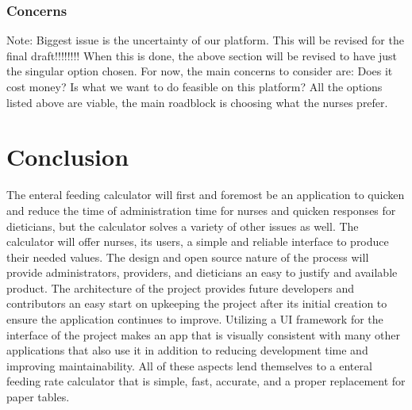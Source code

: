 \documentclass[onecolumn, draftclsnofoot,10pt, compsoc]{IEEEtran}
\begin{document}
\subsubsection{Concerns}
Note: Biggest issue is the uncertainty of our platform. This will be revised for the final draft!!!!!!!! When this is done, the above section will be revised to have just the singular option chosen.
\newline
For now, the main concerns to consider are: Does it cost money? Is what we want to do feasible on this platform? All the options listed above are viable, the main roadblock is choosing what the nurses prefer.
\section{Conclusion}
The enteral feeding calculator will first and foremost be an application to quicken and reduce the time of administration time for nurses and quicken responses for dieticians, but the calculator solves a variety of other issues as well.
The calculator will offer nurses, its users, a simple and reliable interface to produce their needed values.
The design  and open source nature of the process will provide administrators, providers, and dieticians an easy to justify and available product.
The architecture of the project provides future developers and contributors an easy start on upkeeping the project after its initial creation to ensure the application continues to improve.
Utilizing a UI framework for the interface of the project makes an app that is visually consistent with many other applications that also use it in addition to reducing development time and improving maintainability.
All of these aspects lend themselves to a enteral feeding rate calculator that is simple, fast, accurate, and a proper replacement for paper tables.
\printbibliography[title=\section{References}]
%
\end{document}
